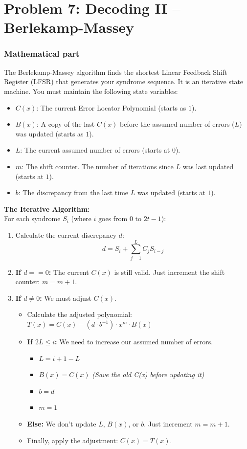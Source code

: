 \documentclass[11pt]{article}
\begin{document}
\section*{Problem 7: Decoding II -- Berlekamp-Massey}

\subsubsection*{Mathematical part}
The Berlekamp-Massey algorithm finds the shortest Linear Feedback Shift Register (LFSR) that generates your syndrome sequence. It is an iterative state machine. You must maintain the following state variables:
\begin{itemize}
    \item $C(x)$: The current Error Locator Polynomial (starts as $1$).
    \item $B(x)$: A copy of the last $C(x)$ before the assumed number of errors ($L$) was updated (starts as $1$).
    \item $L$: The current assumed number of errors (starts at $0$).
    \item $m$: The shift counter. The number of iterations since $L$ was last updated (starts at $1$).
    \item $b$: The discrepancy from the last time $L$ was updated (starts at $1$).
\end{itemize}

\textbf{The Iterative Algorithm:} \\
For each syndrome $S_i$ (where $i$ goes from $0$ to $2t-1$):
\begin{enumerate}
    \item Calculate the current discrepancy $d$:
    $$d = S_i + \sum_{j=1}^{L} C_j S_{i-j}$$
    \item \textbf{If $d == 0$:} The current $C(x)$ is still valid. Just increment the shift counter: $m = m + 1$.
    \item \textbf{If $d \neq 0$:} We must adjust $C(x)$.
    \begin{itemize}
        \item Calculate the adjusted polynomial: $T(x) = C(x) - (d \cdot b^{-1}) \cdot x^m \cdot B(x)$
        \item \textbf{If $2L \le i$:} We need to increase our assumed number of errors.
            \begin{itemize}
                \item $L = i + 1 - L$
                \item $B(x) = C(x)$ \quad \textit{(Save the old C(x) before updating it)}
                \item $b = d$
                \item $m = 1$
            \end{itemize}
        \item \textbf{Else:} We don't update $L$, $B(x)$, or $b$. Just increment $m = m + 1$.
        \item Finally, apply the adjustment: $C(x) = T(x)$.
    \end{itemize}
\end{enumerate}
\end{document}
